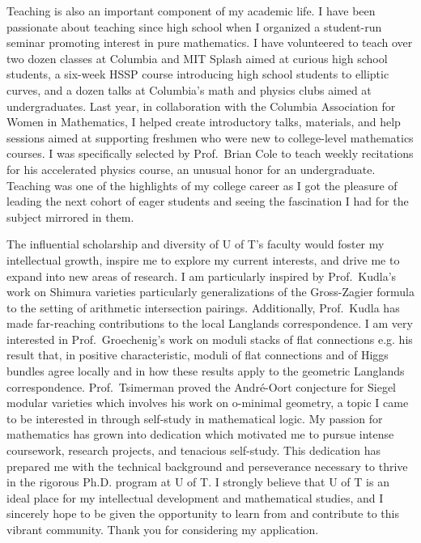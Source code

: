 \documentclass[11pt]{article}
\begin{document}
Teaching is also an important component of my academic life. I have been passionate about teaching since high school when I organized a student-run seminar promoting interest in pure mathematics. I have volunteered to teach over two dozen classes at Columbia and MIT Splash aimed at curious high school students, a six-week HSSP course introducing high school students to elliptic curves, and a dozen talks at Columbia's math and physics clubs aimed at undergraduates. Last year, in collaboration with the Columbia Association for Women in Mathematics, I helped create introductory talks, materials, and help sessions aimed at supporting freshmen who were new to college-level mathematics courses. I was specifically selected by Prof.\ Brian Cole to teach weekly recitations for his accelerated physics course, an unusual honor for an undergraduate. Teaching was one of the highlights of my college career as I got the pleasure of leading the next cohort of eager students and seeing the fascination I had for the subject mirrored in them.
\par
The influential scholarship and diversity of U of T's faculty would foster my intellectual growth, inspire me to explore my current interests, and drive me to expand into new areas of research. I am particularly inspired by Prof.\ Kudla's work on Shimura varieties particularly generalizations of the Gross-Zagier formula to the setting of arithmetic intersection pairings. Additionally, Prof.\ Kudla has made far-reaching contributions to the local Langlands correspondence. I am very interested in Prof.\ Groechenig's work on moduli stacks of flat connections e.g. his result that, in positive characteristic, moduli of flat connections and of Higgs bundles agree \etale locally and in how these results apply to the geometric Langlands correspondence. Prof.\ Tsimerman proved the Andr\'{e}-Oort conjecture for Siegel modular varieties which involves his work on o-minimal geometry, a topic I came to be interested in through self-study in mathematical logic. My passion for mathematics has grown into dedication which motivated me to pursue intense coursework, research projects, and tenacious self-study. This dedication has prepared me with the technical background and perseverance necessary to thrive in the rigorous Ph.D. program at U of T. I strongly believe that U of T is an ideal place for my intellectual development and mathematical studies, and I sincerely hope to be given the opportunity to learn from and contribute to this vibrant community. Thank you for considering my application.
\end{document}
